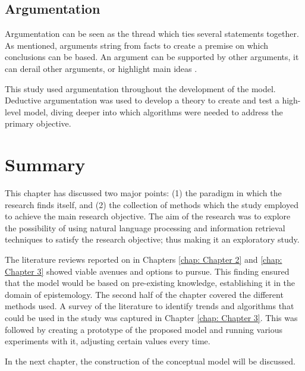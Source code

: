 \subsection{Argumentation}

Argumentation can be seen as the thread which ties several statements together. As mentioned, arguments string from facts to create a premise on which conclusions can be based. An argument can be supported by other arguments, it can derail other arguments, or highlight main ideas \cite{walton2009argumentation}. 

This study used argumentation throughout the development of the model. Deductive argumentation was used to develop a theory to create and test a high-level model, diving deeper into which algorithms were needed to address the primary objective.

\section{Summary}

This chapter has discussed two major points: (1) the paradigm in which the research finds itself, and (2) the collection of methods which the study employed to achieve the main research objective. The aim of the research was to explore the possibility of using natural language processing and information retrieval techniques to satisfy the research objective; thus making it an exploratory study.

The literature reviews reported on in Chapters \ref{chap: Chapter 2} and \ref{chap: Chapter 3} showed viable avenues and options to pursue. This finding ensured that the model would be based on pre-existing knowledge, establishing it in the domain of epistemology. The second half of the chapter covered the different methods used. A survey of the literature to identify trends and algorithms that could be used in the study was captured in Chapter \ref{chap: Chapter 3}. This was followed by creating a prototype of the proposed model and running various experiments with it, adjusting certain values every time.

In the next chapter, the construction of the conceptual model will be discussed.
